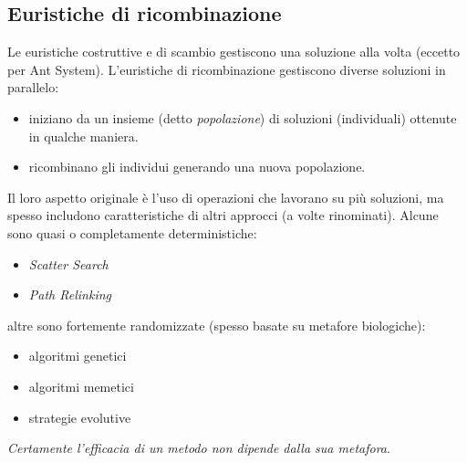 \documentclass{article}
\begin{document}
\subsection{Euristiche di ricombinazione}
Le euristiche costruttive e di scambio gestiscono una soluzione alla volta (eccetto per Ant System).
L'euristiche di ricombinazione gestiscono diverse soluzioni in parallelo:
\begin{itemize}
    \item iniziano da un insieme (detto \textit{popolazione}) di soluzioni (individuali)
    ottenute in qualche maniera.
    \item ricombinano gli individui generando una nuova popolazione.
\end{itemize}
Il loro aspetto originale è l'uso di operazioni che lavorano su più soluzioni, ma
spesso includono caratteristiche di altri approcci (a volte rinominati).
Alcune sono quasi o completamente deterministiche:
\begin{itemize}
    \item \textit{Scatter Search}
    \item \textit{Path Relinking}
\end{itemize}
altre sono fortemente randomizzate (spesso basate su metafore biologiche):
\begin{itemize}
    \item algoritmi genetici
    \item algoritmi memetici
    \item strategie evolutive
\end{itemize}
\textit{Certamente l'efficacia di un metodo non dipende dalla sua metafora}.
\end{document}

